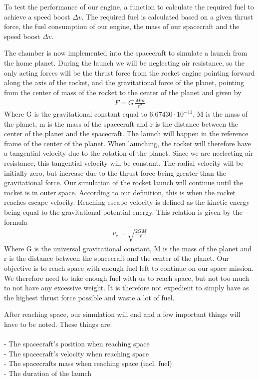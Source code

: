\documentclass[reprint,english,notitlepage]{revtex4-2}
\begin{document}
To test the performance of our engine, a function to calculate the required fuel to achieve a speed boost $\Delta v$.
The required fuel is calculated based on a given thrust force, the fuel consumption of our engine, the mass of our spacecraft and the speed boost $\Delta v$.

The chamber is now implemented into the spacecraft to simulate a launch from the home planet.
During the launch we will be neglecting air resistance, so the only acting forces will be the thrust force from the rocket engine pointing forward along the axis of the rocket, and the gravitational force of the planet, pointing from the center of mass of the rocket to the center of the planet and given by
\begin{align*}
    F = G\,\frac{Mm}{r^2}
\end{align*}
Where G is the gravitational constant equal to $6.67430 \cdot 10^{-11}$, M is the mass of the planet, m is the mass of the spacecraft and r is the distance between the center of the planet and the spacecraft.
The launch will happen in the reference frame of the center of the planet.
When launching, the rocket will therefore have a tangential velocity due to the rotation of the planet. Since we are neclecting air resistance, this tangential velocity will be constant.
The radial velocity will be initially zero, but increase due to the thrust force being greater than the gravitational force.
Our simulation of the rocket launch will continue until the rocket is in outer space. According to our definition, this is when the rocket reaches escape velocity.
Reaching escape velocity is defined as the kinetic energy being equal to the gravitational potential energy. This relation is given by the formula
\begin{align*}
    v_e = \sqrt{\frac{2GM}{r}}
\end{align*}
Where G is the universal gravitational constant, M is the mass of the planet and r is the distance between the spacecraft and the center of the planet.
Our objective is to reach space with enough fuel left to continue on our space mission.
We therefore need to take enough fuel with us to reach space, but not too much to not have any excessive weight.
It is therefore not expedient to simply have as the highest thrust force possible and waste a lot of fuel.

After reaching space, our simulation will end and a few important things will have to be noted. These things are:\\\\
- The spacecraft's position when reaching space\\
- The spacecraft's velocity when reaching space\\
- The spacecrafts mass when reaching space (incl. fuel)\\
- The duration of the launch\\
\end{document}
